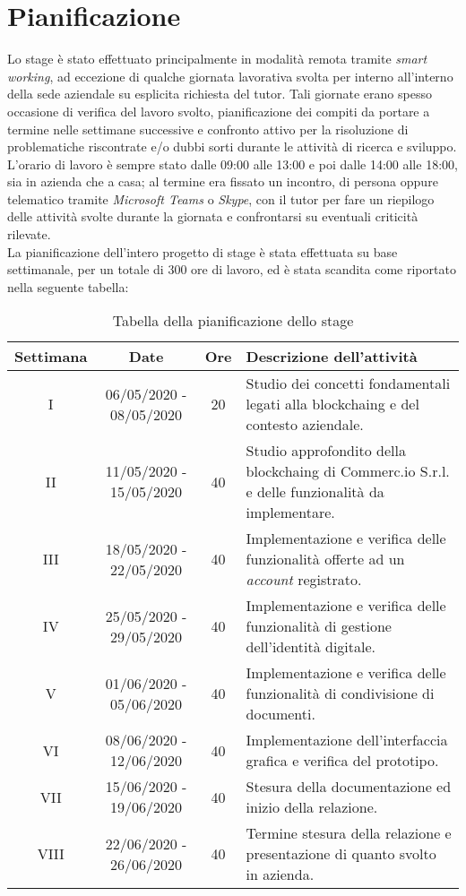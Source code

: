 \section{Pianificazione}

Lo stage è stato effettuato principalmente in modalità remota tramite \textit{smart working}, ad eccezione di qualche giornata lavorativa svolta per interno all'interno della sede aziendale su esplicita richiesta del tutor. Tali giornate erano spesso occasione di verifica del lavoro svolto, pianificazione dei compiti da portare a termine nelle settimane successive e confronto attivo per la risoluzione di problematiche riscontrate e/o dubbi sorti durante le attività di ricerca e sviluppo.\\
L'orario di lavoro è sempre stato dalle 09:00 alle 13:00 e poi dalle 14:00 alle 18:00, sia in azienda che a casa; al termine era fissato un incontro, di persona oppure telematico tramite \textit{Microsoft Teams} o \textit{Skype}, con il tutor per fare un riepilogo delle attività svolte durante la giornata e confrontarsi su eventuali criticità rilevate.\\
La pianificazione dell'intero progetto di stage è stata effettuata su base settimanale, per un totale di 300 ore di lavoro, ed è stata scandita come riportato nella seguente tabella:

\begin{table}[H]
	\begin{tabularx}{\textwidth}{|c|c|c|p{5cm}|}
		\hline
		\textbf{Settimana} & \textbf{Date} & \textbf{Ore} & \textbf{Descrizione dell'attività} \\\hline
		I & 06/05/2020 - 08/05/2020 & 20 & Studio dei concetti fondamentali legati alla \gls{blockchaing} e del contesto aziendale. \\\hline
		II & 11/05/2020 - 15/05/2020 & 40 & Studio approfondito della \gls{blockchaing} di Commerc.io S.r.l. e delle funzionalità da implementare. \\\hline
		III & 18/05/2020 - 22/05/2020 & 40 & Implementazione e verifica delle funzionalità offerte ad un \textit{account} registrato. \\\hline
		IV & 25/05/2020 - 29/05/2020 & 40 & Implementazione e verifica delle funzionalità di gestione dell'identità digitale. \\\hline
		V & 01/06/2020 - 05/06/2020 & 40 & Implementazione e verifica delle funzionalità di condivisione di documenti. \\\hline
		VI & 08/06/2020 - 12/06/2020 & 40 & Implementazione dell'interfaccia grafica e verifica del prototipo. \\\hline
		VII & 15/06/2020 - 19/06/2020 & 40 & Stesura della documentazione ed inizio della relazione. \\\hline
		VIII & 22/06/2020 - 26/06/2020 & 40 & Termine stesura della relazione e presentazione di quanto svolto in azienda. \\\hline
	\end{tabularx}
	\caption{Tabella della pianificazione dello stage}
	\label{tab:pianificazione}
\end{table}

